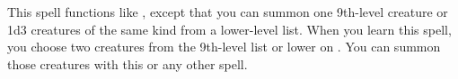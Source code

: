 \begin{spellheader}
    \spelldur{\durshort \dismissable}
\end{spellheader}
\begin{spelleffects}
    \spelleffect This spell functions like , except that you can summon one 9th-level creature or 1d3 creatures of the same kind from a lower-level list. When you learn this spell, you choose two creatures from the 9th-level list or lower on . You can summon those creatures with this or any other  spell.


\end{spelleffects}
